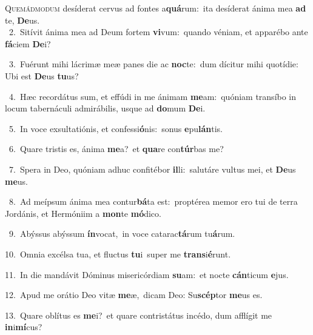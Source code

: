\lettrine{\initial\textcolor{\initialcolor}{Q}}{uemádmodum} desíderat cervus ad fontes a\-\textbf{quá}\-rum:~\star ita desíderat ánima mea \textbf{ad} te, \textbf{De}\-us.\\
{\numbfont\textcolor{\numbcolor}{~2.}}~Sitívit ánima mea ad Deum fortem \textbf{vi}\-vum:~\star quando véniam, et apparébo ante \textbf{fá}\-ciem \textbf{De}\-i?\par
{\numbfont\textcolor{\numbcolor}{~3.}}~Fuérunt mihi lácrimæ meæ panes die ac \textbf{noc}\-te:~\star dum dícitur mihi quotídie: Ubi est \textbf{De}\-us \textbf{tu}\-us?\par
{\numbfont\textcolor{\numbcolor}{~4.}}~Hæc recordátus sum, et effúdi in me ánimam \textbf{me}\-am:~\star quóniam transíbo in locum tabernáculi admirábilis, usque ad \textbf{do}\-mum \textbf{De}\-i.\par
{\numbfont\textcolor{\numbcolor}{~5.}}~In voce exsultatiónis, et confessi\-\textbf{ó}\-nis:~\star sonus \textbf{e}\-pu\-\textbf{lán}\-tis.\par
{\numbfont\textcolor{\numbcolor}{~6.}}~Quare tristis es, ánima \textbf{me}\-a?~\star et \textbf{qua}\-re con\-\textbf{túr}\-bas me?\par
{\numbfont\textcolor{\numbcolor}{~7.}}~Spera in Deo, quóniam adhuc confitébor \textbf{il}\-li:~\star salutáre vultus mei, et \textbf{De}\-us \textbf{me}\-us.\par
{\numbfont\textcolor{\numbcolor}{~8.}}~Ad meípsum ánima mea contur\-\textbf{bá}\-ta est:~\star proptérea memor ero tui de terra Jordánis, et Hermóniim a \textbf{mon}\-te \textbf{mó}\-dico.\par
{\numbfont\textcolor{\numbcolor}{~9.}}~Abýssus abýssum \textbf{ín}\-vocat,~\star in voce catarac\-\textbf{tá}\-rum tu\-\textbf{á}\-rum.\par
{\numbfont\textcolor{\numbcolor}{10.}}~Omnia excélsa tua, et fluctus \textbf{tu}\-i~\star super me \textbf{trans}\-i\-\textbf{é}\-runt.\par
{\numbfont\textcolor{\numbcolor}{11.}}~In die mandávit Dóminus misericórdiam \textbf{su}\-am:~\star et nocte \textbf{cán}\-ticum \textbf{e}\-jus.\par
{\numbfont\textcolor{\numbcolor}{12.}}~Apud me orátio Deo vitæ \textbf{me}\-æ,~\star dicam Deo: Su\-\textbf{scép}\-tor \textbf{me}\-us es.\par
{\numbfont\textcolor{\numbcolor}{13.}}~Quare oblítus es \textbf{me}\-i?~\star et quare contristátus incédo, dum afflígit me \textbf{in}\-i\-\textbf{mí}\-cus?\par
